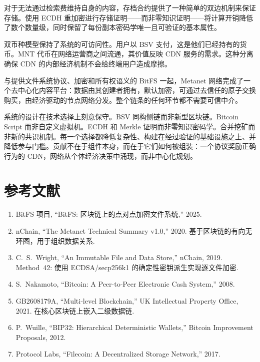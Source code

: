 \documentclass[11pt,a4paper]{article}
\begin{document}
对于无法通过检索费维持自身的内容，存档合约提供了一种简单的双边机制来保证存储。使用 ECDH 重加密进行存储证明——而非零知识证明——将计算开销降低了数个数量级，同时保留了每份副本密码学唯一且可验证的基本属性。

双币种模型保持了系统的可访问性。用户以 BSV 支付，这是他们已经持有的货币。MNT 代币在网络运营商之间流通，其价值反映 CDN 服务的需求。这种分离确保 CDN 的内部经济机制不会给终端用户造成摩擦。

与提供文件系统协议、加密和所有权语义的 BitFS 一起，Metanet 网络完成了一个去中心化内容平台：数据由其创建者拥有，默认加密，可通过去信任的原子交换购买，由经济驱动的节点网络分发。整个链条的任何环节都不需要可信中介。

系统的设计在技术选择上刻意保守。BSV 同构侧链而非新型区块链。Bitcoin Script 而非自定义虚拟机。ECDH 和 Merkle 证明而非零知识密码学。合并挖矿而非新的共识机制。每一个选择都降低复杂性、构建在经过验证的基础设施之上、并降低参与门槛。贡献不在于组件本身，而在于它们如何被组装：一个协议奖励正确行为的 CDN，网络从个体经济决策中涌现，而非中心化规划。

\section*{参考文献}

\begin{enumerate}
\item BitFS 项目, ``BitFS: 区块链上的点对点加密文件系统,'' 2025.

\item nChain, ``The Metanet Technical Summary v1.0,'' 2020. 基于区块链的有向无环图，用于组织数据关系.

\item C.~S.~Wright, ``An Immutable File and Data Store,'' nChain, 2019. Method~42: 使用 ECDSA/secp256k1 的确定性密钥派生实现逐文件加密.

\item S.~Nakamoto, ``Bitcoin: A Peer-to-Peer Electronic Cash System,'' 2008.

\item GB2608179A, ``Multi-level Blockchain,'' UK Intellectual Property Office, 2021. 在核心区块链上嵌入二级数据链.

\item P.~Wuille, ``BIP32: Hierarchical Deterministic Wallets,'' Bitcoin Improvement Proposals, 2012.

\item Protocol Labs, ``Filecoin: A Decentralized Storage Network,'' 2017.
\end{enumerate}
\end{document}
